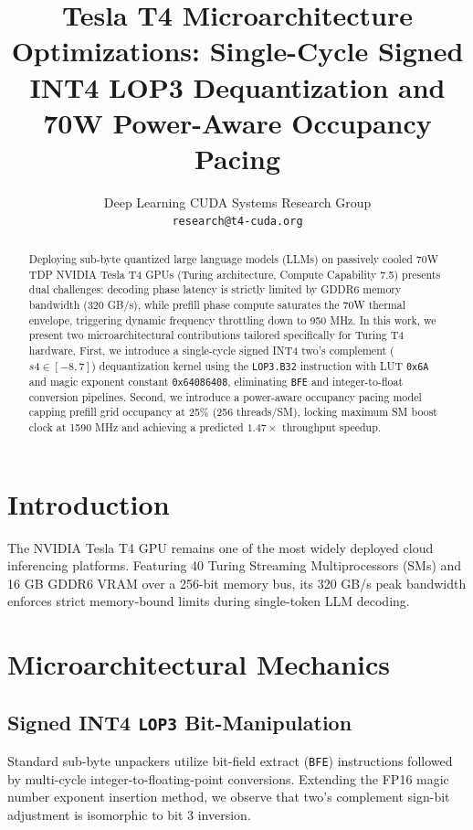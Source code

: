 \documentclass[10pt,twocolumn,letterpaper]{article}
\title{Tesla T4 Microarchitecture Optimizations: Single-Cycle Signed INT4 LOP3 Dequantization and 70W Power-Aware Occupancy Pacing}
\author{
Deep Learning CUDA Systems Research Group\\
{\tt\small research@t4-cuda.org}
}
\begin{document}
\maketitle

\begin{abstract}
Deploying sub-byte quantized large language models (LLMs) on passively cooled 70W TDP NVIDIA Tesla T4 GPUs (Turing architecture, Compute Capability 7.5) presents dual challenges: decoding phase latency is strictly limited by GDDR6 memory bandwidth (320 GB/s), while prefill phase compute saturates the 70W thermal envelope, triggering dynamic frequency throttling down to 950 MHz. In this work, we present two microarchitectural contributions tailored specifically for Turing T4 hardware. First, we introduce a single-cycle signed INT4 two's complement ($s4 \in [-8, 7]$) dequantization kernel using the \texttt{LOP3.B32} instruction with LUT \texttt{0x6A} and magic exponent constant \texttt{0x64086408}, eliminating \texttt{BFE} and integer-to-float conversion pipelines. Second, we introduce a power-aware occupancy pacing model capping prefill grid occupancy at 25\% (256 threads/SM), locking maximum SM boost clock at 1590 MHz and achieving a predicted $1.47\times$ throughput speedup.
\end{abstract}

\section{Introduction}
The NVIDIA Tesla T4 GPU remains one of the most widely deployed cloud inferencing platforms. Featuring 40 Turing Streaming Multiprocessors (SMs) and 16 GB GDDR6 VRAM over a 256-bit memory bus, its 320 GB/s peak bandwidth enforces strict memory-bound limits during single-token LLM decoding.

\section{Microarchitectural Mechanics}

\subsection{Signed INT4 \texttt{LOP3} Bit-Manipulation}
Standard sub-byte unpackers utilize bit-field extract (\texttt{BFE}) instructions followed by multi-cycle integer-to-floating-point conversions. Extending the FP16 magic number exponent insertion method, we observe that two's complement sign-bit adjustment is isomorphic to bit 3 inversion. 
\end{document}

